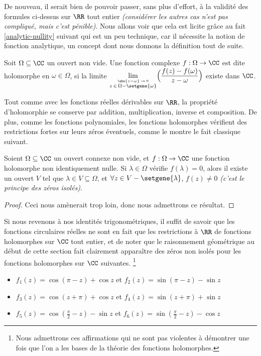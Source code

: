 De nouveau, il serait bien de pouvoir passer, sans plus d'effort, à la validité des formules ci-dessus sur $\RR$ tout entier \emph{(considérer les autres cas n'est pas compliqué, mais c'est pénible)}.
%
Nous allons voir que cela est licite grâce au fait \ref{analytic-nullity} suivant qui est un peu technique, car il nécessite la notion de fonction analytique, un concept dont nous donnons la définition tout de suite.


\begin{defi}
    Soit $\Omega \subseteq \CC$ un ouvert non vide.
	Une fonction complexe $f: \Omega \rightarrow \CC$ est dite holomorphe en $\omega \in \Omega$, 
	si la limite 
	$\displaystyle \lim_{\stackrel{\abs{z - \omega} \, \rightarrow \, 0}{z \, \in \, \Omega - \setgene{\omega}}}\!\Big( \frac{f(z) - f(\omega)}{z - \omega} \Big)$
	existe dans $\CC$.
\end{defi}


\medskip

Tout comme avec les fonctions réelles dérivables sur $\RR$, la propriété d'holomorphie se conserve par addition, multiplication, inverse et composition.
De plus, comme les fonctions polynomiales, les fonctions holomorphes vérifient des restrictions fortes sur leurs zéros éventuels, comme le montre le fait classique suivant.

\begin{fact} \label{analytic-nullity}
    Soient $\Omega \subseteq \CC$ un ouvert connexe non vide,
    et
    $f: \Omega \rightarrow \CC$ une fonction holomorphe non identiquement nulle.
	Si $\lambda \in \Omega$ vérifie $f(\lambda) = 0$,
	alors il existe un ouvert $V$ tel que 
	$\lambda \in V \subseteq \Omega$,
	et
	$\forall z \in V - \setgene{\lambda}$, $f(z) \neq 0$ 
	\emph{(c'est le principe des zéros isolés)}. 
\end{fact}


\begin{proof}
	Ceci nous amènerait trop loin, donc nous admettrons ce résultat.
\end{proof}


Si nous revenons à nos identités trigonométriques, il suffit de savoir que les fonctions circulaires réelles ne sont en fait que les restrictions à $\RR$ de fonctions holomorphes sur $\CC$ tout entier, et de noter que le raisonnement géométrique au début de cette section fait clairement apparaître des zéros non isolés pour les fonctions holomorphes sur $\CC$ suivantes.%
\footnote{
	Nous admettrons ces affirmations qui ne sont pas violentes à démontrer une fois que l'on a les bases de la théorie des fonctions holomorphes.
}
%
\begin{itemize}[label=\small\textbullet]
	\item $f_1(z) = \cos (\pi - z) + \cos z$ 
	   et $f_2(z) = \sin (\pi - z) - \sin z$ 

	\smallskip
	\item $f_3(z) =\cos (z + \pi) + \cos z$ 
	   et $f_4(z) =\sin (z + \pi) + \sin z$

	\smallskip
	\item $f_5(z) =\cos \left( \frac{\pi}{2} - z \right) - \sin z$ 
	   et $f_6(z) =\sin \left( \frac{\pi}{2} - z \right) - \cos z$ 
\end{itemize}


